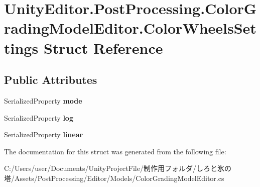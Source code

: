 \hypertarget{struct_unity_editor_1_1_post_processing_1_1_color_grading_model_editor_1_1_color_wheels_settings}{}\section{Unity\+Editor.\+Post\+Processing.\+Color\+Grading\+Model\+Editor.\+Color\+Wheels\+Settings Struct Reference}
\label{struct_unity_editor_1_1_post_processing_1_1_color_grading_model_editor_1_1_color_wheels_settings}
\subsection*{Public Attributes}
\begin{DoxyCompactItemize}
\item 
\mbox{\label{struct_unity_editor_1_1_post_processing_1_1_color_grading_model_editor_1_1_color_wheels_settings_a9e608da2c1fd4f4ba44c08076a3a3cbd}} 
Serialized\+Property {\bfseries mode}
\item 
\mbox{\label{struct_unity_editor_1_1_post_processing_1_1_color_grading_model_editor_1_1_color_wheels_settings_a750328efd11ce4d6d787b629724d57f4}} 
Serialized\+Property {\bfseries log}
\item 
\mbox{\label{struct_unity_editor_1_1_post_processing_1_1_color_grading_model_editor_1_1_color_wheels_settings_a38d83b18795473b832350888cfe71ed6}} 
Serialized\+Property {\bfseries linear}
\end{DoxyCompactItemize}


The documentation for this struct was generated from the following file\+:\begin{DoxyCompactItemize}
\item 
C\+:/\+Users/user/\+Documents/\+Unity\+Project\+File/制作用フォルダ/しろと氷の塔/\+Assets/\+Post\+Processing/\+Editor/\+Models/Color\+Grading\+Model\+Editor.\+cs\end{DoxyCompactItemize}

